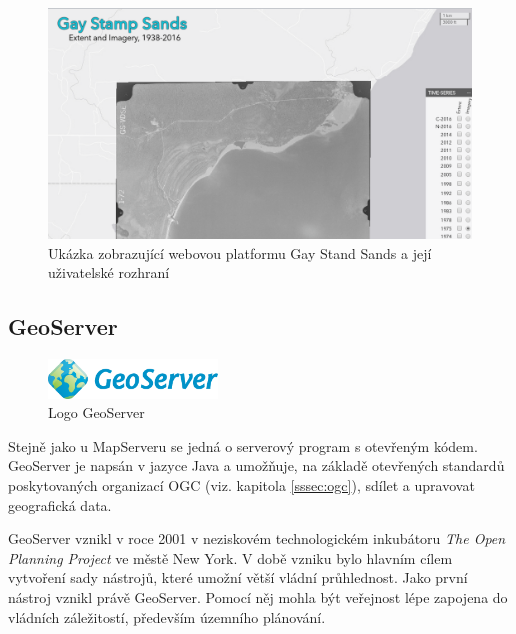 \begin{figure}[h!]  \centering
\includegraphics[width=1\textwidth]{../img/gay-sands.png}
	\caption{Ukázka zobrazující webovou platformu Gay Stand
Sands a její uživatelské rozhraní}
	\label{fig:gay-sands}
\end{figure}

\newpage
\subsection{GeoServer}
\label{sssec:geoserver}

\begin{figure}[h!]  \centering
\includegraphics[width=0.4\textwidth]{../img/geoserver-logo.png}
	\caption{Logo GeoServer 
	\cite{geoserver-layer-edit}}
	\label{fig:geoserver-logo}
\end{figure} \bigskip

Stejně jako u MapServeru se jedná o serverový program s otevřeným
kódem. GeoServer je napsán v jazyce Java a umožňuje, na základě
otevřených standardů poskytovaných organizací OGC (viz. kapitola \ref{sssec:ogc}), sdílet a upravovat
geografická data.

GeoServer vznikl v roce 2001 v neziskovém technologickém inkubátoru
\textit{The Open Planning Project} ve městě New York. V době vzniku bylo
hlavním cílem vytvoření sady nástrojů, které umožní větší vládní
průhlednost. Jako první nástroj vznikl právě GeoServer. Pomocí něj
mohla být veřejnost lépe zapojena do vládních záležitostí, především
územního plánování.

